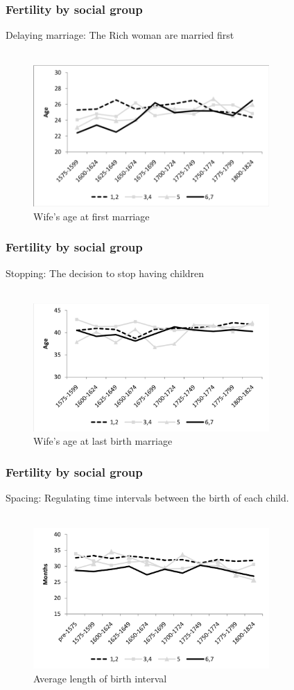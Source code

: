 \documentclass[pdftex,12pt,xcolor=pdftex,table]{beamer}
\begin{document}
\begin{frame}
\frametitle{Fertility by social group}
Delaying marriage: The Rich woman are married first\\~\\
\begin{figure}[h!]
    \centering
    \includegraphics[width=9cm]{figure5.png}
    \caption{Wife's age at first marriage}
 \end{figure}
\end{frame}
\begin{frame}
\frametitle{Fertility by social group}
Stopping: The decision to stop having children\\~\\
\begin{figure}[h!]
    \centering
    \includegraphics[width=9cm]{figure6.png}
    \caption{Wife's age at last birth marriage}
 \end{figure}
\end{frame}
\begin{frame}
\frametitle{Fertility by social group}
Spacing: Regulating time intervals between the birth of each child.\\~\\
\begin{figure}[h!]
    \centering
    \includegraphics[width=9cm]{figure7.png}
    \caption{Average length of birth interval}
 \end{figure}\\~\\
\end{frame}
\end{document}
